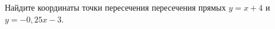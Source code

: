 \begin{ex}
	\begin{condition}
		Найдите координаты точки пересечения пересечения прямых \( y=x+4 \) и \( y=-0,25x-3 \).
	\end{condition}
\end{ex}